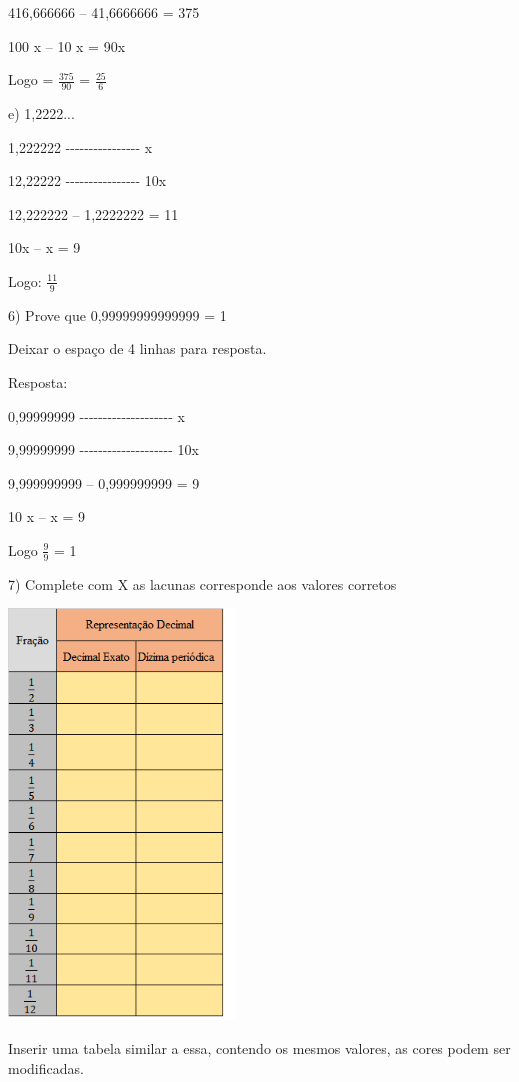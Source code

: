 {416,666666 -- 41,6666666 = 375

100 x -- 10 x = 90x

Logo = \(\frac{375}{90}\) = \(\frac{25}{6}\)

e) 1,2222...

1,222222 -\/-\/-\/-\/-\/-\/-\/-\/-\/-\/-\/-\/-\/-\/-\/- x

12,22222 -\/-\/-\/-\/-\/-\/-\/-\/-\/-\/-\/-\/-\/-\/-\/- 10x

12,222222 -- 1,2222222 = 11

10x -- x = 9

Logo: \(\frac{11}{9}\)

6) Prove que 0,99999999999999 = 1

Deixar o espaço de 4 linhas para resposta.

Resposta:

0,99999999 -\/-\/-\/-\/-\/-\/-\/-\/-\/-\/-\/-\/-\/-\/-\/-\/-\/-\/-\/- x

9,99999999 -\/-\/-\/-\/-\/-\/-\/-\/-\/-\/-\/-\/-\/-\/-\/-\/-\/-\/-\/-
10x

9,999999999 -- 0,999999999 = 9

10 x -- x = 9

Logo \(\frac{9}{9}\) = 1

7) Complete com X as lacunas corresponde aos valores corretos

\includegraphics[width=2.37378in,height=4.29167in]{./imgSAEB_8_MAT/media/image3.png}

Inserir uma tabela similar a essa, contendo os mesmos valores, as cores
podem ser modificadas.

}

